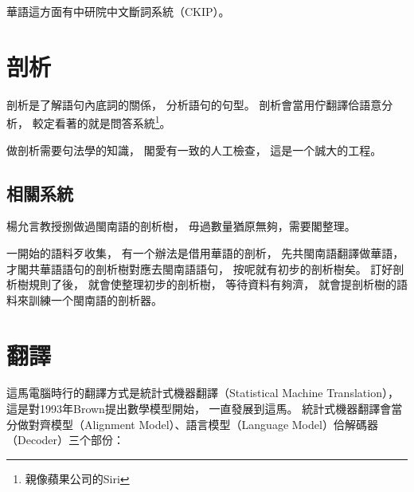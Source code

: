 
華語這方面有中研院中文斷詞系統（CKIP）\cite{CKIP論文}。

%

\section{剖析}
\label{節：剖析}
剖析是了解語句內底詞的關係，
分析語句的句型。
剖析會當用佇翻譯佮語意分析，
較定看著的就是問答系統\footnote{親像蘋果公司的Siri}。

做剖析需要句法學的知識，
閣愛有一致的人工檢查，
這是一个誠大的工程。

\subsection{相關系統}
\label{小節：剖析相關系統}
楊允言教授捌做過閩南語的剖析樹\cite{台語文語法結構樹建置}，
毋過數量猶原無夠，需要閣整理。

一開始的語料歹收集，
有一个辦法是借用華語的剖析，
先共閩南語翻譯做華語，
才閣共華語語句的剖析樹\cite{chen2005chinese}對應去閩南語語句，
按呢就有初步的剖析樹矣。
訂好剖析樹規則了後，
就會使整理初步的剖析樹，
等待資料有夠濟，
就會提剖析樹的語料來訓練一个閩南語的剖析器\cite{klein2003accurate}。

\section{翻譯}
\label{節：翻譯}
這馬電腦時行的翻譯方式是統計式機器翻譯（Statistical Machine Translation），
這是對1993年Brown提出數學模型\cite{brown1993mathematics}開始，
一直發展到這馬。
統計式機器翻譯會當分做對齊模型（Alignment Model）、語言模型（Language Model）佮解碼器（Decoder）三个部份：


